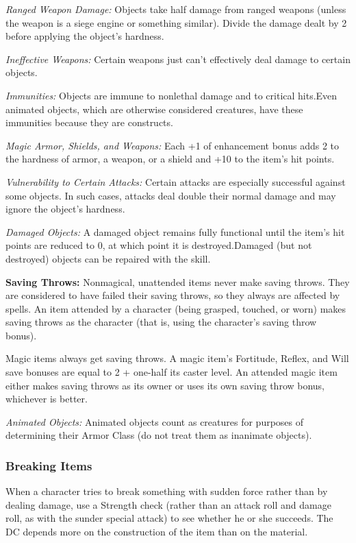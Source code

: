 \textit{Ranged Weapon Damage:} Objects take half damage from ranged weapons (unless the weapon is a siege engine or something similar). Divide the damage dealt by 2 before applying the object's hardness.

\textit{Ineffective Weapons:} Certain weapons just can't effectively deal damage to certain objects.

\textit{Immunities:} Objects are immune to nonlethal damage and to critical hits.Even animated objects, which are otherwise considered creatures, have these immunities because they are constructs.

\textit{Magic Armor, Shields, and Weapons:} Each +1 of enhancement bonus adds 2 to the hardness of armor, a weapon, or a shield and +10 to the item's hit points.

\textit{Vulnerability to Certain Attacks:} Certain attacks are especially successful against some objects. In such cases, attacks deal double their normal damage and may ignore the object's hardness.

\textit{Damaged Objects:} A damaged object remains fully functional until the item's hit points are reduced to 0, at which point it is destroyed.Damaged (but not destroyed) objects can be repaired with the  skill.

\textbf{Saving Throws:} Nonmagical, unattended items never make saving throws. They are considered to have failed their saving throws, so they always are affected by spells. An item attended by a character (being grasped, touched, or worn) makes saving throws as the character (that is, using the character's saving throw bonus).

Magic items always get saving throws. A magic item's Fortitude, Reflex, and Will save bonuses are equal to 2 + one-half its caster level. An attended magic item either makes saving throws as its owner or uses its own saving throw bonus, whichever is better.

\textit{Animated Objects:} Animated objects count as creatures for purposes of determining their Armor Class (do not treat them as inanimate objects).

\subsubsection{Breaking Items}

When a character tries to break something with sudden force rather than by dealing damage, use a Strength check (rather than an attack roll and damage roll, as with the sunder special attack) to see whether he or she succeeds. The DC depends more on the construction of the item than on the material.

